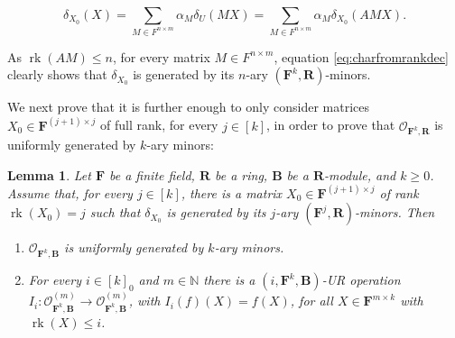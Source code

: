 \documentclass[11pt]{amsart}
\theoremstyle{plain}
\newtheorem{lemma}[thm]{Lemma}
\theoremstyle{definition}
\newcommand{\N}{{\mathbb N}}
\newcommand{\F}{{\mathbf F}}
\newcommand{\alg}[1]{\mathbf{#1}}
\newcommand{\clonoid}[1]{\mathcal{#1}}
\newcommand{\clodO}{\clonoid{O}}
\newcommand{\algB}{\alg{B}}
\newcommand{\algR}{\alg{R}}
\DeclareMathOperator{\rk}{rk}
\begin{document}
\begin{equation} \label{eq:charfromrankdec}
\delta_{X_0}(X) = \sum_{M \in F^{n \times m }} \alpha_M \delta_{U}(MX) = \sum_{M \in F^{n \times m}} \alpha_M \delta_{X_0}(AMX).\end{equation}

As $\rk(AM) \leq n$, for every matrix $M \in F^{n \times m}$, equation \eqref{eq:charfromrankdec} clearly shows that $\delta_{X_0}$ is generated by its $n$-ary $(\F^k,\algR)$-minors.

We next prove that it is further enough to only consider matrices $X_0 \in \F^{(j+1)\times j}$ of full rank, for every $j\in [k]$, in order to prove that $\clodO_{\F^k,\algR}$ is uniformly generated by $k$-ary minors:

\begin{lemma} \label{lemma:reductiontosingleton}
Let $\F$ be a finite field, $\algR$ be a ring, $\algB$ be a $\algR$-module, and $k \geq 0$. Assume that, for every $j \in [k]$, there is a matrix $X_0 \in \F^{(j+1)\times j}$ of rank $\rk(X_0) = j$ such that $ \delta_{X_0}$ is generated by its $j$-ary $(\F^j,\algR)$-minors. Then
\begin{enumerate}
\item $\clodO_{\F^k,\algB}$ is uniformly generated by $k$-ary minors.
\item For every $i\in [k]_0$ and $m \in \N$ there is a $(i,\F^k,\algB)$-UR operation $I_i \colon \clodO_{\F^k,\algB}^{(m)} \to \clodO_{\F^k,\algB}^{(m)}$, with $I_i(f)(X) = f(X)$, for all $X \in \F^{m\times k}$ with $\rk(X) \leq i$.
\end{enumerate}
\end{lemma}
\end{document}
